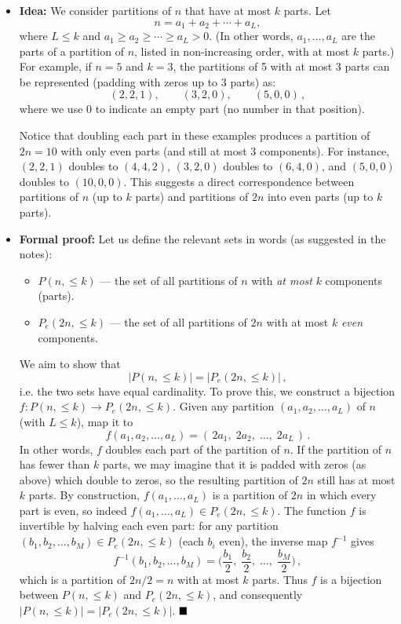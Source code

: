 \documentclass[docmute]{article}
\begin{document}
\begin{itemize}
  \item \textbf{Idea:} We consider partitions of $n$ that have at most $k$ parts. Let 
  \[
    n = a_1 + a_2 + \cdots + a_L,
  \] 
  where $L \le k$ and $a_1 \ge a_2 \ge \cdots \ge a_L > 0$. (In other words, $a_1,\ldots,a_L$ are the parts of a partition of $n$, listed in non-increasing order, with at most $k$ parts.) For example, if $n=5$ and $k=3$, the partitions of 5 with at most 3 parts can be represented (padding with zeros up to 3 parts) as:
  \[
    (2,2,1), \qquad (3,2,0), \qquad (5,0,0)\,,
  \] 
  where we use $0$ to indicate an empty part (no number in that position). %
  
  Notice that doubling each part in these examples produces a partition of $2n=10$ with only even parts (and still at most 3 components). For instance, $(2,2,1)$ doubles to $(4,4,2)$, $(3,2,0)$ doubles to $(6,4,0)$, and $(5,0,0)$ doubles to $(10,0,0)$. This suggests a direct correspondence between partitions of $n$ (up to $k$ parts) and partitions of $2n$ into even parts (up to $k$ parts).
  
  \item \textbf{Formal proof:} Let us define the relevant sets in words (as suggested in the notes): %
  \begin{itemize}
    \item $P(n,\le k)$ — the set of all partitions of $n$ with \emph{at most} $k$ components (parts).
    \item $P_e(2n,\le k)$ — the set of all partitions of $2n$ with at most $k$ \emph{even} components.
  \end{itemize}
  We aim to show that 
  \[
    |P(n,\le k)| = |P_e(2n,\le k)|\,,
  \] 
  i.e. the two sets have equal cardinality. To prove this, we construct a bijection $f: P(n,\le k) \to P_e(2n,\le k)$. Given any partition $(a_1,a_2,\dots,a_L)$ of $n$ (with $L \le k$), map it to 
  \[
    f(a_1,a_2,\ldots,a_L) = (\,2a_1,\; 2a_2,\; \ldots,\; 2a_L\,)\,. 
  \] 
  In other words, $f$ doubles each part of the partition of $n$. If the partition of $n$ has fewer than $k$ parts, we may imagine that it is padded with zeros (as above) which double to zeros, so the resulting partition of $2n$ still has at most $k$ parts. By construction, $f(a_1,\ldots,a_L)$ is a partition of $2n$ in which every part is even, so indeed $f(a_1,\ldots,a_L) \in P_e(2n,\le k)$. The function $f$ is invertible by halving each even part: for any partition $(b_1,b_2,\ldots,b_M) \in P_e(2n,\le k)$ (each $b_i$ even), the inverse map $f^{-1}$ gives 
  \[
    f^{-1}(b_1,b_2,\ldots,b_M) = \Big(\frac{b_1}{2},\; \frac{b_2}{2},\; \ldots,\; \frac{b_M}{2}\Big)\,,
  \] 
  which is a partition of $2n/2 = n$ with at most $k$ parts. Thus $f$ is a bijection between $P(n,\le k)$ and $P_e(2n,\le k)$, and consequently $|P(n,\le k)| = |P_e(2n,\le k)|$. $\hfill\blacksquare$
\end{itemize}
\end{document}
